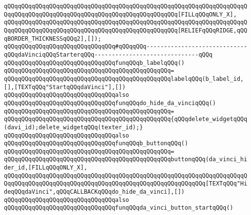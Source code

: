 \verb|qQQqqQQqqQQqqQQqqQQqqQQqqQQqqQQqqQQqqQQqqQQqqQQqqQQqqQQqqQQqqQQqqQQqqQQqqQQqqQQqqQQqqQQqqQQqqQQqqQQqqQQqqQQqqQQqqQQqqQQq[FILLqQQqONLY_X],|\newline
\verb|qQQqqQQqqQQqqQQqqQQqqQQqqQQqqQQqqQQqqQQqqQQqqQQqqQQqqQQqqQQqqQQqqQQqqQQqqQQqqQQqqQQqqQQqqQQqqQQqqQQqqQQqqQQqqQQqqQQqqQQq[RELIEFqQQqRIDGE,qQQqBORDER_THICKNESSqQQq2],[]);|\newline
\newline
\verb|qQQqqQQqqQQqqQQqqQQqqQQqqQQqqQQq#qQQqqQQq-----------------------------qQQqdaVinciqQQqStarterqQQq------------------------------qQQq|\newline
\newline
\newline
\verb|qQQqqQQqqQQqqQQqqQQqqQQqqQQqqQQqfunqQQqb_labelqQQq()|\newline
\verb|qQQqqQQqqQQqqQQqqQQqqQQqqQQqqQQqqQQqqQQqqQQqqQQq=|\newline
\verb|qQQqqQQqqQQqqQQqqQQqqQQqqQQqqQQqqQQqqQQqqQQqqQQqlabelqQQq(b_label_id,[],[TEXTqQQq"StartqQQqdaVinci"],[])|\newline
\newline
\verb|qQQqqQQqqQQqqQQqqQQqqQQqqQQqqQQqalso|\newline
\verb|qQQqqQQqqQQqqQQqqQQqqQQqqQQqqQQqfunqQQqdo_hide_da_vinciqQQq()|\newline
\verb|qQQqqQQqqQQqqQQqqQQqqQQqqQQqqQQqqQQqqQQqqQQqqQQq=|\newline
\verb|qQQqqQQqqQQqqQQqqQQqqQQqqQQqqQQqqQQqqQQqqQQqqQQq{qQQqdelete_widgetqQQq(davi_id);delete_widgetqQQq(texter_id);}|\newline
\newline
\verb|qQQqqQQqqQQqqQQqqQQqqQQqqQQqqQQqalso|\newline
\verb|qQQqqQQqqQQqqQQqqQQqqQQqqQQqqQQqfunqQQqb_buttonqQQq()|\newline
\verb|qQQqqQQqqQQqqQQqqQQqqQQqqQQqqQQqqQQqqQQqqQQqqQQq=|\newline
\verb|qQQqqQQqqQQqqQQqqQQqqQQqqQQqqQQqqQQqqQQqqQQqqQQqbuttonqQQq(da_vinci_hider_id,[FILLqQQqONLY_X],|\newline
\verb|qQQqqQQqqQQqqQQqqQQqqQQqqQQqqQQqqQQqqQQqqQQqqQQqqQQqqQQqqQQqqQQqqQQqqQQqqQQqqQQqqQQqqQQqqQQqqQQqqQQqqQQqqQQqqQQqqQQqqQQqqQQqqQQq[TEXTqQQq"HideqQQqdaVinci",qQQqCALLBACKqQQqdo_hide_da_vinci],[])|\newline
\newline
\verb|qQQqqQQqqQQqqQQqqQQqqQQqqQQqqQQqalso|\newline
\verb|qQQqqQQqqQQqqQQqqQQqqQQqqQQqqQQqfunqQQqda_vinci_button_startqQQq()|\newline
